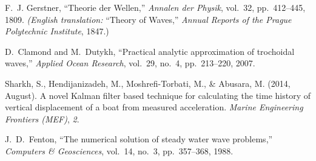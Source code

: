 \documentclass[12pt,letterpaper]{article}
\begin{document}
\begin{thebibliography}{4}

F.~J. Gerstner, ``Theorie der Wellen,'' 
\emph{Annalen der Physik}, vol.~32, pp.~412–445, 1809.  
\emph{(English translation: }``Theory of Waves,'' \emph{Annual Reports of the Prague Polytechnic Institute}, 1847.)

D.~Clamond and M.~Dutykh, ``Practical analytic approximation of trochoidal waves,'' 
\emph{Applied Ocean Research}, vol.~29, no.~4, pp.~213–220, 2007.

Sharkh, S., Hendijanizadeh, M., Moshrefi-Torbati, M., \& Abusara, M. (2014, August). 
A novel Kalman filter based technique for calculating the time history of vertical displacement of a boat from measured acceleration. 
\textit{Marine Engineering Frontiers (MEF)}, \textit{2}.

J.~D.~Fenton, “The numerical solution of steady water wave problems,” \emph{Computers \& Geosciences}, vol.~14, no.~3, pp.~357–368, 1988.

\end{thebibliography}
\end{document}
